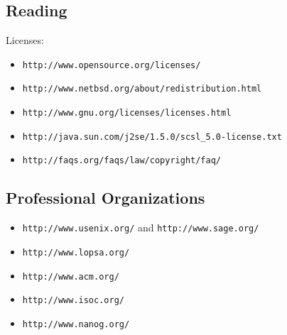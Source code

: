 \documentclass[xga]{xdvislides}
\begin{document}
\subsection{Reading}
Licenses:
\begin{itemize}
	\item \verb+http://www.opensource.org/licenses/+
	\item \verb+http://www.netbsd.org/about/redistribution.html+
	\item \verb+http://www.gnu.org/licenses/licenses.html+
	\item \verb+http://java.sun.com/j2se/1.5.0/scsl_5.0-license.txt+
	\item \verb+http://faqs.org/faqs/law/copyright/faq/+
\end{itemize}

\subsection{Professional Organizations}
\begin{itemize}
	\item \verb+http://www.usenix.org/+ and \verb+http://www.sage.org/+
	\item \verb+http://www.lopsa.org/+
	\item \verb+http://www.acm.org/+
	\item \verb+http://www.isoc.org/+
	\item \verb+http://www.nanog.org/+
\end{itemize}
\end{document}
